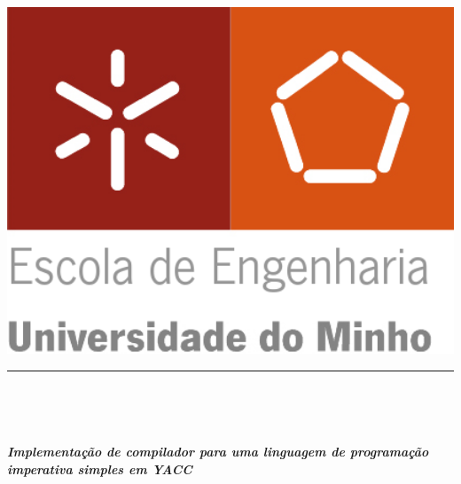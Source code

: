 \begin{titlepage}


\begin{minipage}{0.3\textwidth}
\begin{flushleft} 
\includegraphics[width=1.1\textwidth]{./report/logo.png}
\end{flushleft}
\end{minipage}
\hfill
\begin{minipage}{0.6\textwidth}
\begin{flushright} 

\noindent\rule{\textwidth}{0.7mm}
\end{flushright}
\end{minipage}\\[1cm]


\vspace{3cm}


\begin{center}

	\\[1cm]


{\large \bfseries \emph{Implementação de compilador para uma linguagem de programação
	imperativa simples em \emph{YACC}\\[2cm] }

}
\end{center}
\end{titlepage}
